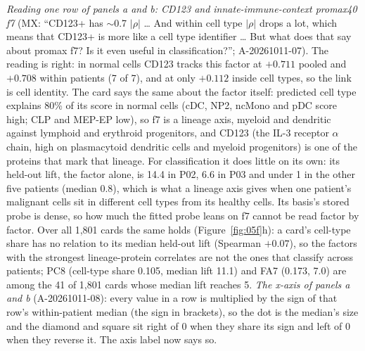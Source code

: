\emph{Reading one row of panels a and b: CD123 and innate-immune-context promax40 f7} (MX: ``CD123+ has $\sim$0.7 $|\rho|$ \ldots{} And within cell type $|\rho|$ drops a lot, which means that CD123+ is more like a cell type identifier \ldots{} But what does that say about promax f7? Is it even useful in classification?''; A-20261011-07). The reading is right: in normal cells CD123 tracks this factor at $+0.711$ pooled and $+0.708$ within patients (7 of 7), and at only $+0.112$ inside cell types, so the link is cell identity. The card says the same about the factor itself: predicted cell type explains 80\% of its score in normal cells (cDC, NP2, ncMono and pDC score high; CLP and MEP-EP low), so f7 is a lineage axis, myeloid and dendritic against lymphoid and erythroid progenitors, and CD123 (the IL-3 receptor $\alpha$ chain, high on plasmacytoid dendritic cells and myeloid progenitors) is one of the proteins that mark that lineage. For classification it does little on its own: its held-out lift, the factor alone, is 14.4\pp{} in P02, 6.6\pp{} in P03 and under 1\pp{} in the other five patients (median 0.8\pp), which is what a lineage axis gives when one patient's malignant cells sit in different cell types from its healthy cells. Its basis's stored probe is dense, so how much the fitted probe leans on f7 cannot be read factor by factor. Over all 1,801 cards the same holds (Figure~\ref{fig:05f}h): a card's cell-type share has no relation to its median held-out lift (Spearman $+0.07$), so the factors with the strongest lineage-protein correlates are not the ones that classify across patients; PC8 (cell-type share 0.105, median lift 11.1\pp) and FA7 (0.173, 7.0\pp) are among the 41 of 1,801 cards whose median lift reaches 5\pp. \emph{The x-axis of panels a and b} (A-20261011-08): every value in a row is multiplied by the sign of that row's within-patient median (the sign in brackets), so the dot is the median's size and the diamond and square sit right of 0 when they share its sign and left of 0 when they reverse it. The axis label now says so.

